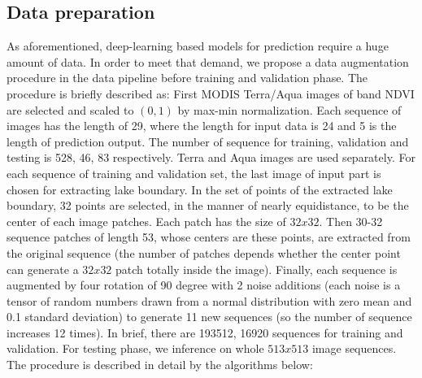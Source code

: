 \subsection{Data preparation}
As aforementioned, deep-learning based models for prediction require a huge amount of data. In order to meet that demand, we propose a data augmentation procedure in the data pipeline before training and validation phase. The procedure is briefly described as: First MODIS Terra/Aqua images of band NDVI are selected and scaled to $(0,1)$ by max-min normalization. Each sequence of images has the length of 29, where the length for input data is 24 and 5 is the length of prediction output. The number of sequence for training, validation and testing is 528, 46, 83 respectively. Terra and Aqua images are used separately. For each sequence of training and validation set, the last image of input part is chosen for extracting lake boundary. In the set of points of the extracted lake boundary, 32 points are selected, in the manner of nearly equidistance, to be the center of each image patches. Each patch has the size of $32 { x } 32$. Then 30-32 sequence patches of length 53, whose centers are these points, are extracted from the original sequence (the number of patches depends whether the center point can generate a $32 { x } 32$ patch totally inside the image). Finally, each sequence is augmented by four rotation of 90 degree with 2 noise additions (each noise is a tensor of random numbers drawn from a normal distribution with zero mean and 0.1 standard deviation) to generate 11 new sequences (so the number of sequence increases 12 times). In brief, there are 193512, 16920 sequences for training and validation. For testing phase, we inference on whole $513 { x } 513$ image sequences. The procedure is described in detail by the algorithms below:

